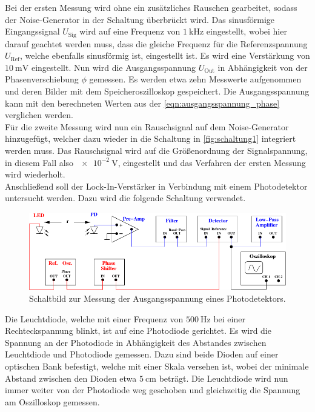     Bei der ersten Messung wird ohne ein zusätzliches Rauschen gearbeitet,
    sodass der Noise-Generator in der Schaltung überbrückt wird.
    Das sinusförmige Eingangssignal $U_\text{Sig}$ wird auf eine Frequenz von $\SI{1}{\kilo\hertz}$ eingestellt,
    wobei hier darauf geachtet werden muss,
    dass die gleiche Frequenz für die Referenzspannung $U_\text{Ref}$,
    welche ebenfalls sinusförmig ist,
    eingestellt ist.
    Es wird eine Verstärkung von $\SI{10}{\milli\volt}$ eingestellt.
    Nun wird die Ausgangsspannung $U_\text{Out}$ in Abhängigkeit von der Phasenverschiebung $\phi$ gemessen.
    Es werden etwa zehn Messwerte aufgenommen und deren Bilder mit dem Speicheroszilloskop gespeichert.
    Die Ausgangsspannung kann mit den berechneten Werten aus der \autoref{eqn:ausgangsspannung_phase} verglichen werden.\\%
    Für die zweite Messung wird nun ein Rauschsignal auf dem Noise-Generator hinzugefügt,
    welcher dazu wieder in die Schaltung in \autoref{fig:schaltung1} integriert werden muss.
    Das Rauschsignal wird auf die Größenordnung der Signalspannung,
    in diesem Fall also $\SI{e-2}{\volt}$,
    eingestellt und das Verfahren der ersten Messung wird wiederholt.\\

    \label{sec:durchfuehrung:led}
    Anschließend soll der Lock-In-Verstärker in Verbindung mit einem Photodetektor untersucht werden.
    Dazu wird die folgende Schaltung verwendet.
    \begin{figure}[H]
        \centering
        \includegraphics{content/img/Abb_5.pdf}
        \caption{Schaltbild zur Messung der Ausgangsspannung eines Photodetektors. \cite{versuchsanleitung}}
        \label{fig:schaltung2}
    \end{figure}
    Die Leuchtdiode,
    welche mit einer Frequenz von $\SI{500}{\hertz}$ bei einer Rechteckspannung %
    blinkt,
    ist auf eine Photodiode gerichtet.
    Es wird die Spannung an der Photodiode in Abhängigkeit des Abstandes zwischen Leuchtdiode und Photodiode gemessen.
    Dazu sind beide Dioden auf einer optischen Bank befestigt,
    welche mit einer Skala versehen ist,
    wobei der minimale Abstand zwischen den Dioden etwa $\SI{5}{\centi\meter}$ beträgt.
    Die Leuchtdiode wird nun immer weiter von der Photodiode weg geschoben
    und gleichzeitig die Spannung am Oszilloskop gemessen.
